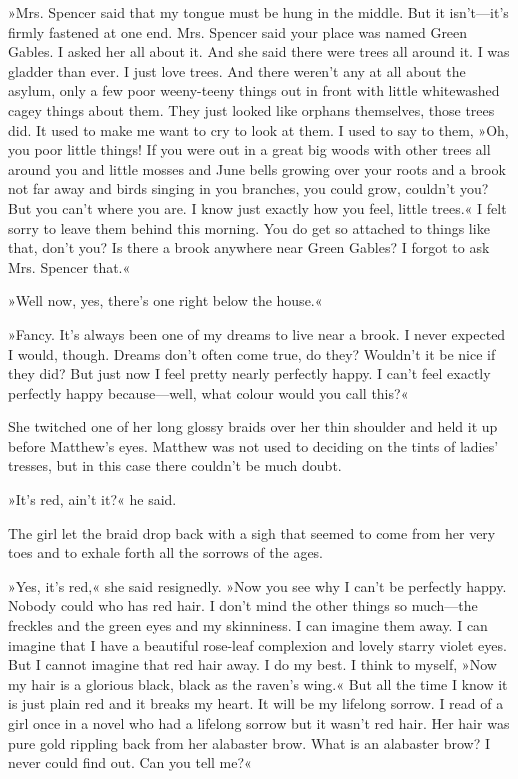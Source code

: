 »Mrs. Spencer said that my tongue must be hung in the middle. But it isn't—it's firmly fastened at one end. Mrs. Spencer said your place was named Green Gables. I asked her all about it. And she said there were trees all around it. I was gladder than ever. I just love trees. And there weren't any at all about the asylum, only a few poor weeny-teeny things out in front with little whitewashed cagey things about them. They just looked like orphans themselves, those trees did. It used to make me want to cry to look at them. I used to say to them, »Oh, you poor little things! If you were out in a great big woods with other trees all around you and little mosses and June bells growing over your roots and a brook not far away and birds singing in you branches, you could grow, couldn't you? But you can't where you are. I know just exactly how you feel, little trees.« I felt sorry to leave them behind this morning. You do get so attached to things like that, don't you? Is there a brook anywhere near Green Gables? I forgot to ask Mrs. Spencer that.«

»Well now, yes, there's one right below the house.«

»Fancy. It's always been one of my dreams to live near a brook. I never expected I would, though. Dreams don't often come true, do they? Wouldn't it be nice if they did? But just now I feel pretty nearly perfectly happy. I can't feel exactly perfectly happy because—well, what colour would you call this?«

She twitched one of her long glossy braids over her thin shoulder and held it up before Matthew's eyes. Matthew was not used to deciding on the tints of ladies' tresses, but in this case there couldn't be much doubt.

»It's red, ain't it?« he said.

The girl let the braid drop back with a sigh that seemed to come from her very toes and to exhale forth all the sorrows of the ages.

»Yes, it's red,« she said resignedly. »Now you see why I can't be perfectly happy. Nobody could who has red hair. I don't mind the other things so much—the freckles and the green eyes and my skinniness. I can imagine them away. I can imagine that I have a beautiful rose-leaf complexion and lovely starry violet eyes. But I cannot imagine that red hair away. I do my best. I think to myself, »Now my hair is a glorious black, black as the raven's wing.« But all the time I know it is just plain red and it breaks my heart. It will be my lifelong sorrow. I read of a girl once in a novel who had a lifelong sorrow but it wasn't red hair. Her hair was pure gold rippling back from her alabaster brow. What is an alabaster brow? I never could find out. Can you tell me?«

